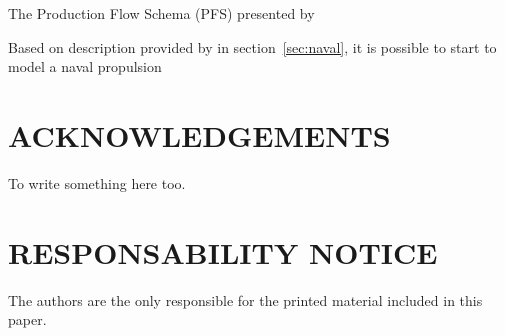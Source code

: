 \documentclass[10pt,fleqn,a4paper,twoside]{article}
\begin{document}
The Production Flow Schema (PFS) presented by \citet{Miyagi1996}\

Based on description provided by in section~\ref{sec:naval}\space, it is possible to start to model a naval propulsion

\section{ACKNOWLEDGEMENTS}
\label{sec:ack}

To write something here too.


\renewcommand{\refname}{}


\section{RESPONSABILITY NOTICE}
\label{sec:legal}

The authors are the only responsible for the printed material included in this paper.
\end{document}
